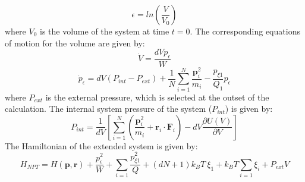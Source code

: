 %
%
\begin{equation}
\epsilon = ln \left( \frac{V}{V_{0}} \right)
\end{equation}
%
%
where $V_{0}$ is the volume of the system at time $t=0$. The corresponding equations of motion for the volume are given by:
%
%
\begin{equation}
\dot{V} = \frac{d V p_{\epsilon}}{W}
\end{equation}
%
%
\begin{equation}
\dot{p}_{\epsilon} = dV \left( P_{int} - P_{ext} \right) + \frac{1}{N} \sum_{i=1}^{N} \frac{\mathbf{p}_{i}^{2}}{m_{i}} - \frac{p_{\xi 1}}{Q_{1}} p_{\epsilon}
\end{equation}
%
%
where $P_{ext}$ is the external pressure, which is selected at the outset of the calculation. The internal system pressure of the system ($P_{int}$) is given by:
%
%
\begin{equation}
P_{int} = \frac{1}{dV} \left[ \sum_{i=1}^{N} \left( \frac{\mathbf{p}_{i}^{2}}{m_{i}} + \mathbf{r}_{i} \cdot \mathbf{F}_{i} \right) - dV \frac{\partial U(V)}{\partial V} \right]
\end{equation}
%
%
The Hamiltonian of the extended system is given by:
%
%
\begin{equation}
H_{NPT} = H(\mathbf{p}, \mathbf{r}) + \frac{p_{\epsilon}^{2}}{W} + \sum_{i=1} \frac{p^{2}_{\xi 1}}{Q} + (dN + 1) k_{B}T \: \xi_{1} + k_{B}T \sum_{i=1} \xi_{i} + P_{ext} V
\end{equation}


